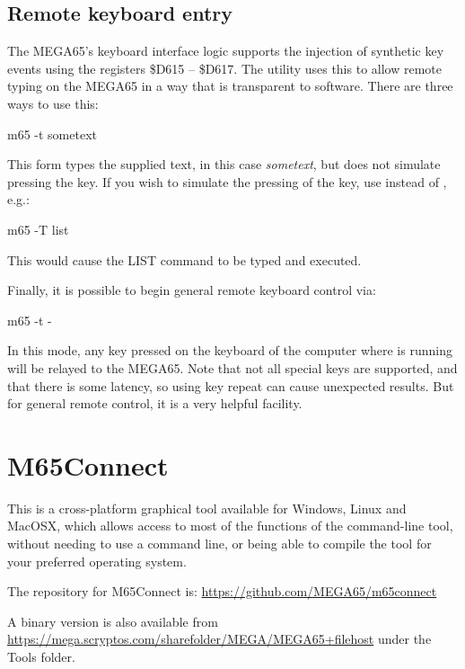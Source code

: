 \subsection{Remote keyboard entry}

The MEGA65's keyboard interface logic supports the injection of
synthetic key events using the registers \$D615 -- \$D617.
The  utility uses this to allow remote typing on the MEGA65
in a way that is transparent to software.  There are three ways to use
this:

\begin{screenoutput}
m65 -t sometext
\end{screenoutput}

This form types the supplied text, in this case {\em sometext}, but
does not simulate pressing the  key.  If you wish
to simulate the pressing of the  key, use 
instead of , e.g.:

\begin{screenoutput}
m65 -T list
\end{screenoutput}

This would cause the LIST command to be typed and executed.

Finally, it is possible to begin general remote keyboard control via:

\begin{screenoutput}
m65 -t -
\end{screenoutput}

In this mode, any key pressed on the keyboard of the computer
where  is running will be relayed to the MEGA65.  Note that
not all special keys are supported, and that there is some latency, so
using key repeat can cause unexpected results.  But for general remote
control, it is a very helpful facility.


\section{M65Connect}

This is a cross-platform graphical tool available for Windows, Linux
and MacOSX, which allows access to most of the functions of
the  command-line tool, without needing to use a
command line, or being able to compile the tool for your preferred
operating system.

The repository for M65Connect is: \url{https://github.com/MEGA65/m65connect}

A binary version is also available from \url{https://mega.scryptos.com/sharefolder/MEGA/MEGA65+filehost} under the Tools folder.


